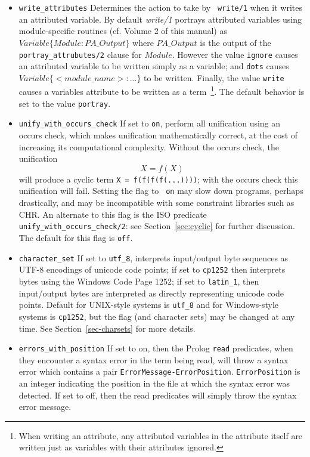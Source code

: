 \begin{description}
\begin{itemize}
\item {\tt write\_attributes} Determines the action to take by {\tt
  write/1} when it writes an attributed variable.  By default {\em
  write/1} portrays attributed variables using module-specific
  routines (cf. Volume 2 of this manual) as $Variable \{ Module :
  PA\_Output\}$ where $PA\_Output$ is the output of the {\tt
    portray\_attrubutes/2} clause for $Module$.  However the value
  {\tt ignore} causes an attributed variable to be written simply as a
  variable; and {\tt dots} causes $Variable \{ <module\_name> : ...\}$
  to be written.  Finally, the value {\tt write} causes a variables
  attribute to be written as a term~\footnote{When writing an
    attribute, any attributed variables in the attribute itself are
    written just as variables with their attributes ignored.}.  The
  default behavior is set to the value {\tt portray}.

\item {\tt unify\_with\_occurs\_check} If set to {\tt on}, perform all
  unification using an occurs check, which makes unification
  mathematically correct, at the cost of increasing its computational
  complexity.  Without the occurs check, the unification
\[
   X = f(X)
\]
  will produce a cyclic term {\tt X = f(f(f(f(...))))}; with the
  occurs check this unification will fail.  Setting the flag to {\tt
    on} may slow down programs, perhaps drastically, and may be
  incompatible with some constraint libraries such as CHR.  An
  alternate to this flag is the ISO predicate {\tt
    unify\_with\_occurs\_check/2}: see Section~\ref{sec:cyclic} for
    further discussion.  The default for this flag is {\tt off}.
%
\item {\tt character\_set} If set to {\tt utf\_8}, interprets
input/output byte sequences as UTF-8 encodings of unicode code points;
if set to {\tt cp1252} then interprets bytes using the Windows Code
Page 1252; if set to {\tt latin\_1}, then input/output bytes are
interpreted as directly representing unicode code points.  Default for
UNIX-style systems is {\tt utf\_8} and for Windows-style systems is
{\tt cp1252}, but the flag (and character sets) may be changed at any
time.  See Section~\ref{sec-charsets} for more details.
%
\item {\tt errors\_with\_position} If set to on, then the Prolog
{\tt read} predicates, when they encounter a syntax error in the term
being read, will throw a syntax error which contains a pair
\texttt{ErrorMessage-ErrorPosition}.  {\tt ErrorPosition} is an integer
indicating the position in the file at which the syntax error was
detected. If set to off, then the read predicates will simply throw
the syntax error message.


\end{itemize}
\end{description}
